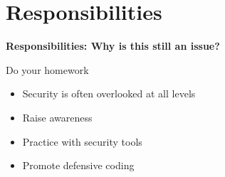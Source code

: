 
\section{Responsibilities}

{
\begin{frame}[plain]
    \begin{center}
      \Huge\bfseries
      Responsibilities: Why is this still an issue?
    \end{center}
\end{frame}
}

\begin{frame}[plain]{Do your homework}
  \begin{itemize}
    \item Security is often overlooked at all levels
    \item Raise awareness
    \item Practice with security tools
    \item Promote defensive coding
  \end{itemize}
\end{frame}
